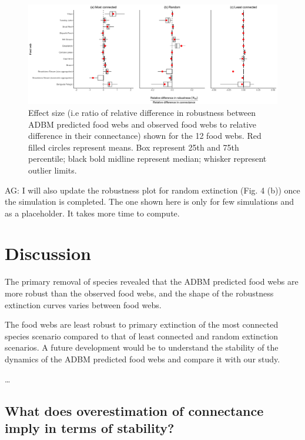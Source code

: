 \documentclass{article}
\begin{document}
\begin{figure}

{\centering \includegraphics[width=450px]{../results/plot_R50_slope} 

}

\caption{\label{fig:fig_r5} Effect size (i.e ratio of relative difference in robustness between ADBM predicted food webs and observed food webs to relative difference in their connectance) shown for the 12 food webs. Red filled circles represent means. Box represent 25th and 75th percentile; black bold midline represent median; whisker represent outlier limits.}\label{fig:unnamed-chunk-6}
\end{figure}

AG: I will also update the robustness plot for random extinction (Fig. 4
(b)) once the simulation is completed. The one shown here is only for
few simulations and as a placeholder. It takes more time to compute.

\hypertarget{discussion}{%
\section{Discussion}\label{discussion}}

The primary removal of species revealed that the ADBM predicted food
webs are more robust than the observed food webs, and the shape of the
robustness extinction curves varies between food webs.

The food webs are least robust to primary extinction of the most
connected species scenario compared to that of least connected and
random extinction scenarios. A future development would be to understand
the stability of the dynamics of the ADBM predicted food webs and
compare it with our study.

\ldots{}

\hypertarget{what-does-overestimation-of-connectance-imply-in-terms-of-stability}{%
\subsection{What does overestimation of connectance imply in terms of
stability?}\label{what-does-overestimation-of-connectance-imply-in-terms-of-stability}}
\end{document}
